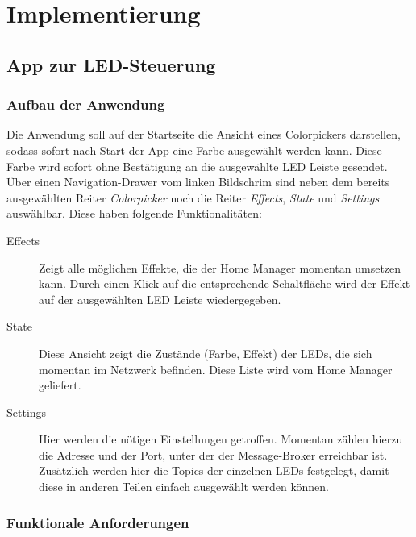 \chapter{Implementierung}



\section{App zur LED-Steuerung} \label{impl_steuer_app}

\subsection{Aufbau der Anwendung}
Die Anwendung soll auf der Startseite die Ansicht eines Colorpickers darstellen, sodass sofort nach Start der App eine Farbe ausgewählt werden kann. Diese Farbe wird sofort ohne Bestätigung an die ausgewählte LED Leiste gesendet. \\
Über einen Navigation-Drawer vom linken Bildschrim sind neben dem bereits ausgewählten Reiter \textit{Colorpicker} noch die Reiter \textit{Effects}, \textit{State} und \textit{Settings} auswählbar. Diese haben folgende Funktionalitäten:
\begin{description}
	\item[Effects] Zeigt alle möglichen Effekte, die der Home Manager momentan umsetzen kann. Durch einen Klick auf die entsprechende Schaltfläche wird der Effekt auf der ausgewählten LED Leiste wiedergegeben.
	\item[State] Diese Ansicht zeigt die Zustände (Farbe, Effekt) der LEDs, die sich momentan im Netzwerk befinden. Diese Liste wird vom Home Manager geliefert.
	\item[Settings] Hier werden die nötigen Einstellungen getroffen. Momentan zählen hierzu die Adresse und der Port, unter der der Message-Broker erreichbar ist. Zusätzlich werden hier die Topics der einzelnen LEDs festgelegt, damit diese in anderen Teilen einfach ausgewählt werden können.
\end{description}

\subsection{Funktionale Anforderungen}

